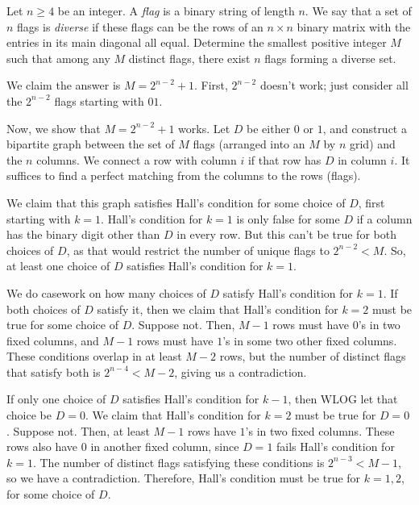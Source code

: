 \documentclass[11pt]{scrartcl}
\providecommand{\printpuid}[1]{\marginpar{\href{https://otis.evanchen.cc/arch/#1}{\ttfamily\footnotesize\color{green!40!black}#1}}}
\begin{document}
\begin{reqproblem}
  Let $n \ge 4$ be an integer.
  A \emph{flag} is a binary string of length $n$.
  We say that a set of $n$ flags is \emph{diverse} if these flags
  can be the rows of an $n \times n$ binary matrix
  with the entries in its main diagonal all equal.
  Determine the smallest positive integer $M$ such that among any $M$ distinct flags,
  there exist $n$ flags forming a diverse set.
\end{reqproblem} \printpuid{10SLC2}

We claim the answer is $M = 2^{n-2} + 1$. First, $2^{n-2}$ doesn't work;
just consider all the $2^{n-2}$ flags starting with $01$.

Now, we show that $M = 2^{n-2} + 1$ works.
Let $D$ be either $0$ or $1$, and construct a bipartite graph between
the set of $M$ flags (arranged into an $M$ by $n$ grid) and the $n$ columns.
We connect a row with column $i$ if that row has $D$ in column $i$.
It suffices to find a perfect matching from the columns to the rows (flags).

We claim that this graph satisfies Hall's condition for some choice of $D$, first starting with $k=1$.
Hall's condition for $k=1$ is only false for some $D$ if a column
has the binary digit other than $D$ in every row.
But this can't be true for both choices of $D$, as that
would restrict the number of unique flags to $2^{n-2} < M$.
So, at least one choice of $D$ satisfies Hall's condition for $k=1$.

We do casework on how many choices of $D$ satisfy Hall's condition for $k=1$.
If both choices of $D$ satisfy it, then
we claim that Hall's condition for $k=2$ must be true for some choice of $D$.
Suppose not. Then, $M-1$ rows must have $0$'s in two fixed columns,
and $M-1$ rows must have $1$'s in some two other fixed columns.
These conditions overlap in at least $M-2$ rows,
but the number of distinct flags that satisfy both is $2^{n-4} < M-2$, giving us a contradiction.

If only one choice of $D$ satisfies Hall's condition for $k-1$, then
WLOG let that choice be $D = 0$.
We claim that Hall's condition for $k=2$ must be true for $D = 0$.
Suppose not. Then, at least $M-1$ rows have $1$'s in two fixed columns.
These rows also have $0$ in another fixed column, since $D=1$ fails Hall's condition for $k=1$.
The number of distinct flags satisfying these conditions is $2^{n-3} < M-1$,
so we have a contradiction.
Therefore, Hall's condition must be true for $k=1,2$, for some choice of $D$.
\end{document}
